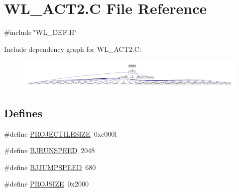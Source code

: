 \hypertarget{WL__ACT2_8C}{
\section{WL\_\-ACT2.C File Reference}
\label{WL__ACT2_8C}
}
{\ttfamily \#include \char`\"{}WL\_\-DEF.H\char`\"{}}\par
Include dependency graph for WL\_\-ACT2.C:
\nopagebreak
\begin{figure}[H]
\begin{center}
\leavevmode
\includegraphics[width=400pt]{WL__ACT2_8C__incl}
\end{center}
\end{figure}
\subsection*{Defines}
\begin{DoxyCompactItemize}
\item 
\#define \hyperlink{WL__ACT2_8C_a549b914ab4082c89fd76b3c22280c415}{PROJECTILESIZE}~0xc000l
\item 
\#define \hyperlink{WL__ACT2_8C_a3a031759dd287025c8f2f4fcbdff99d6}{BJRUNSPEED}~2048
\item 
\#define \hyperlink{WL__ACT2_8C_ad12923b95a8f78a7ae0d003df94809a2}{BJJUMPSPEED}~680
\item 
\#define \hyperlink{WL__ACT2_8C_ac1a02055b2c2bc076ec86ddf95f5be62}{PROJSIZE}~0x2000
\end{DoxyCompactItemize}
